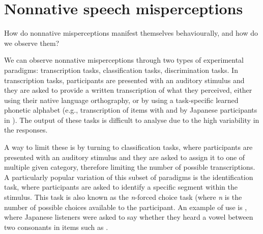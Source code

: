 \section{Nonnative speech misperceptions}

How do nonnative misperceptions manifest themselves behaviourally, and how do we observe them?

We can observe nonnative misperceptions through two types of experimental paradigms: transcription tasks, classification tasks, discrimination tasks.
In transcription tasks, participants are presented with an auditory stimulus and they are asked to provide a written transcription of what they perceived, either using their native language orthography, or by using a task-specific learned phonetic alphabet (e.g., transcription of items with  and  by Japanese participants in \cite{best1992}). The output of these tasks is difficult to analyse due to the high variability in the responses.

A way to limit these is by turning to classification tasks, where participants are presented with an auditory stimulus and they are asked to assign it to one of multiple given category, therefore limiting the number of possible transcriptions.
A particularly popular variation of this subset of paradigms is the identification task, where participants are asked to identify a specific segment within the stimulus. This task is also known as the \textit{n}-forced choice task (where \textit{n} is the number of possible choices available to the participant. An example of use is \cite{dupoux1999}, where Japanese listeners were asked to say whether they heard a  vowel between two consonants in items such as .

